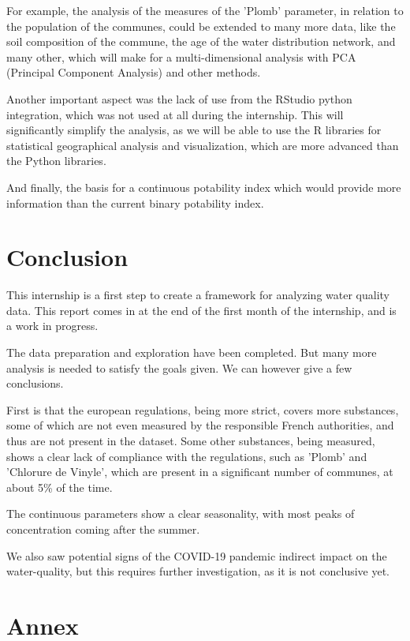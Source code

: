 \documentclass{article}
\begin{document}
For example, the analysis of the measures of the 'Plomb' parameter, in relation to the population of the communes, could be extended to many more data, like the soil composition of the commune, the age of the water distribution network, and many other, which will make for a multi-dimensional analysis with PCA (Principal Component Analysis) and other methods.

Another important aspect was the lack of use from the RStudio python integration, which was not used at all during the internship. This will significantly simplify the analysis, as we will be able to use the R libraries for statistical geographical analysis and visualization, which are more advanced than the Python libraries.

And finally, the basis for a continuous potability index which would provide more information than the current binary potability index.

\newpage
\section{Conclusion}
This internship is a first step to create a framework for analyzing water quality data. This report comes in at the end of the first month of the internship, and is a work in progress.

The data preparation and exploration have been completed. But many more analysis is needed to satisfy the goals given. We can however give a few conclusions.

First is that the european regulations, being more strict, covers more substances, some of which are not even measured by the responsible French authorities, and thus are not present in the dataset.
Some other substances, being measured, shows a clear lack of compliance with the regulations, such as 'Plomb' and 'Chlorure de Vinyle', which are present in a significant number of communes, at about 5\% of the time.

The continuous parameters show a clear seasonality, with most peaks of concentration coming after the summer.

We also saw potential signs of the COVID-19 pandemic indirect impact on the water-quality, but this requires further investigation, as it is not conclusive yet.

\newpage

\appendix
\section{Annex}
\end{document}
